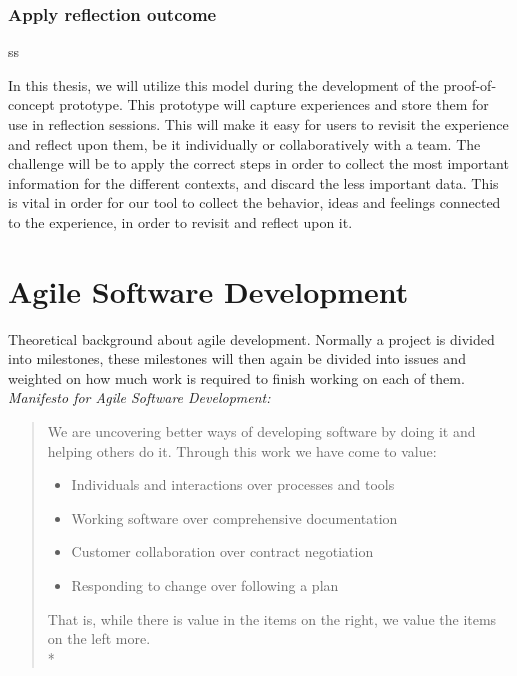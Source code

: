 \subsubsection{Apply reflection outcome}
ss


In this thesis, we will utilize this model during the development of the proof-of-concept prototype. This prototype will capture experiences and store them for use in reflection sessions. This will make it easy for users to revisit the experience and reflect upon them, be it individually or collaboratively with a team. The challenge will be to apply the correct steps in order to collect the most important information for the different contexts, and discard the less important data. This is vital in order for our tool to collect the behavior, ideas and feelings connected to the experience, in order to revisit and reflect upon it. 
\clearpage




\section{Agile Software Development}
Theoretical background about agile development. Normally a project is divided into milestones, these milestones will then again be divided into issues and weighted on how much work is required to finish working on each of them.\linebreak
\emph{Manifesto for Agile Software Development:}\citep{agilemanifesto}
\begin{quotation}
We are uncovering better ways of developing software by doing it and helping others do it. Through this work we have come to value:
\begin{itemize}
\item Individuals and interactions over processes and tools
\item Working software over comprehensive documentation
\item Customer collaboration over contract negotiation
\item Responding to change over following a plan
\end{itemize}
That is, while there is value in the items on
the right, we value the items on the left more.\\*
\end{quotation}

